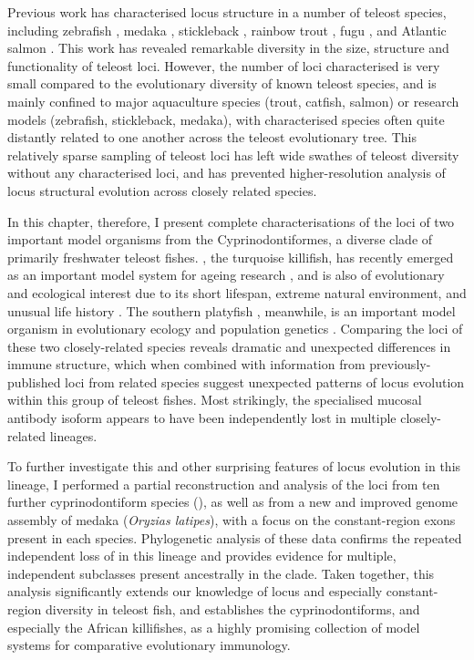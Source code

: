 Previous work has characterised \igh{} locus structure in a number of teleost species, including \parencite{fillatreau2013astonishing} zebrafish \parencite{danilova2005zebrafish}, medaka \parencite{magadan2011medaka}, stickleback \parencite{bao2010stickleback,gambondeza2011stickleback}, rainbow trout \parencite{hansen2005trout}, fugu \parencite{savan2005fugu}, and Atlantic salmon \parencite{yasuike2010salmon}. This work has revealed remarkable diversity in the size, structure and functionality of teleost \igh{} loci. However, the number of loci characterised is very small compared to the evolutionary diversity of known teleost species, and is mainly confined to major aquaculture species (trout, catfish, salmon) or research models (zebrafish, stickleback, medaka), with characterised species often quite distantly related to one another across the teleost evolutionary tree. This relatively sparse sampling of teleost \igh{} loci has left wide swathes of teleost diversity without any characterised \igh{} loci, and has prevented higher-resolution analysis of locus structural evolution across closely related species.

In this chapter, therefore, I present complete characterisations of the \igh{} loci of two important model organisms from the Cyprinodontiformes, a diverse clade of primarily freshwater teleost fishes. \nfu, the turquoise killifish, has recently emerged as an important model system for ageing research \parencite{harel2015platform,valenzano2015genome}, %
and is also of evolutionary and ecological interest due to its short lifespan, extreme natural environment, and unusual life history \parencite{cellerino2016bush}. The southern platyfish \xma, meanwhile, is an important model organism in evolutionary ecology and population genetics \parencite{schartl2013platyfish}.
Comparing the \igh{} loci of these two closely-related species reveals dramatic and unexpected differences in immune structure, which when combined with information from previously-published loci from related species suggest unexpected patterns of locus evolution within this group of teleost fishes. Most strikingly, the specialised mucosal antibody isoform  appears to have been independently lost in multiple closely-related lineages. 

To further investigate this and other surprising features of \igh{} locus evolution in this lineage, I performed a partial reconstruction and analysis of the \igh{} loci from ten further cyprinodontiform species (), as well as from a new and improved genome assembly of medaka (\textit{Oryzias latipes}), with a focus on the constant-region exons present in each species. Phylogenetic analysis of these data confirms the repeated independent loss of  in this lineage and provides evidence for multiple, independent  subclasses present ancestrally in the clade. Taken together, this analysis significantly extends our knowledge of \igh{} locus and especially constant-region diversity in teleost fish, and establishes the cyprinodontiforms, and especially the African killifishes, as a highly promising collection of model systems for comparative evolutionary immunology. %

